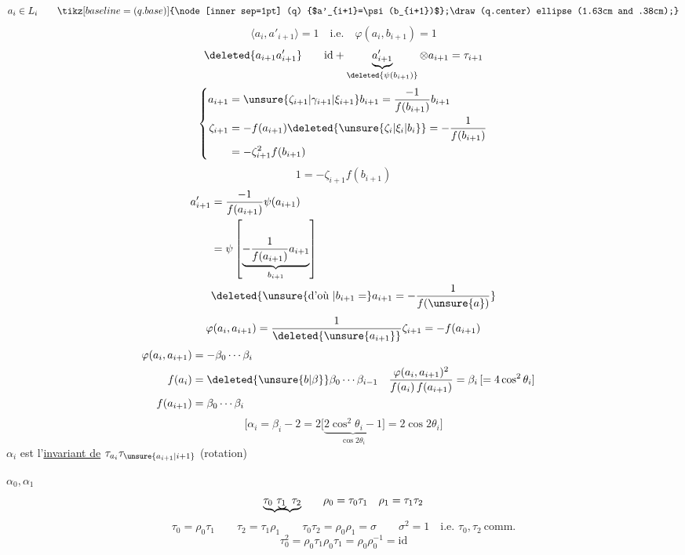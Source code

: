 \[
a_i\in L_i\qquad\mathord{\tikz[baseline=(q.base)]{\node[inner sep=1pt] (q) {$a'_{i+1}=\psi(b_{i+1})$};\draw (q.center) ellipse (1.63cm and .38cm);}}
\]
\[
\langle a_i,a'_{i+1}\rangle=1\quad\text{i.e.}\quad \boxed{\varphi(a_i,b_{i+1})=1}
\]
\[
\deleted{a_{i+1}a'_{i+1}}\qquad
\mathrm{id}+\underbrace{a'_{i+1}}_{\deleted{\psi(b_{i+1})}}\otimes a_{i+1}=\tau_{i+1}
\]
\[
\left\{\begin{aligned}
a_{i+1}&=\unsure{\zeta_{i+1}|\gamma_{i+1}|\xi_{i+1}}b_{i+1}=\frac{-1}{f(b_{i+1})}b_{i+1}\\
\zeta_{i+1}&=-f(a_{i+1})\deleted{\unsure{\zeta_i|\xi_i|b_i}}=-\frac1{f(b_{i+1})}\\
&=-\zeta_{i+1}^2 f(b_{i+1})
\end{aligned}\right.
\]
\[
1=-\zeta_{i+1}f(b_{i+1})
\]
\[
\begin{aligned}
a'_{i+1}&=\frac{-1}{f(a_{i+1})}\psi(a_{i+1})\\
&=\psi\left[\underbrace{-\frac1{f(a_{i+1})}a_{i+1}}_{b_{i+1}}\right]\\
&\deleted{\unsure{\text{d'où }|b_{i+1}=}a_{i+1}=-\frac1{f(\unsure{a})}}
\end{aligned}
\]
\[
\varphi(a_i,a_{i+1})=\frac{1}{\deleted{\unsure{a_{i+1}}}}\zeta_{i+1}=-f(a_{i+1})
\]
\[
\begin{aligned}
\varphi(a_i,a_{i+1})&=-\beta_0\cdots\beta_i\\
f(a_i)&=\deleted{\unsure{b|\beta}}\beta_0\cdots\beta_{i-1}&
\frac{\varphi(a_i,a_{i+1})^2}{f(a_i)\,f(a_{i+1})}&=\beta_i\,[=4\cos^2\theta_i]\\
f(a_{i+1})&=\beta_0\cdots\beta_i
\end{aligned}
\]
\[
\bigl[\alpha_i=\beta_i-2=2\bigl[\underbrace{2\cos^2\theta_i-1}_{\cos2\theta_i}\bigr]=2\cos2\theta_i\bigr]
\]
$\alpha_i$ est l'\uline{invariant de} $\tau_{a_i}\tau_{\unsure{a_{i+1}|i+1}}$ (rotation)

$\alpha_0,\alpha_1$
\[
\underbrace{\tau_0\ \tau_1}\ \tau_2\llap{$\underbrace{\phantom{\tau_1\ \tau_2}}$}
\qquad
\rho_0=\tau_0\tau_1\quad \rho_1=\tau_1\tau_2
\]
\[
\tau_0=\rho_0\tau_1\qquad \tau_2=\tau_1\rho_1\qquad
\tau_0\tau_2=\rho_0\rho_1=\sigma\qquad \sigma^2=1\quad \text{i.e. }\tau_0,\tau_2\ \text{comm.}
\]
\[
\tau_0^2=\rho_0\tau_1\rho_0\tau_1=\rho_0\rho_0^{-1}=\mathrm{id}
\]

